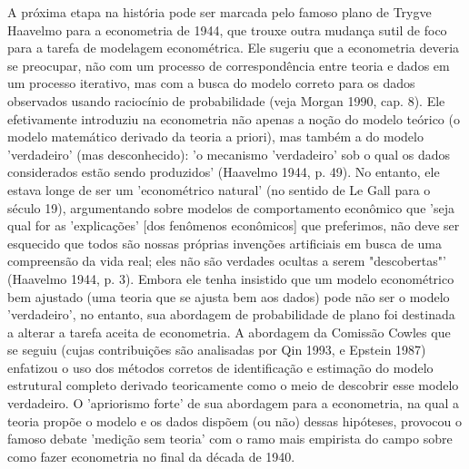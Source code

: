 \documentclass[a4paper,12pt]{article}[abntex2]
\begin{document}
A próxima etapa na história pode ser marcada pelo famoso plano de Trygve Haavelmo para a econometria de 1944, que trouxe outra mudança sutil de foco para a tarefa de modelagem econométrica. Ele sugeriu que a econometria deveria se preocupar, não com um processo de correspondência entre teoria e dados em um processo iterativo, mas com a busca do modelo correto para os dados observados usando raciocínio de probabilidade (veja Morgan 1990, cap. 8). Ele efetivamente introduziu na econometria não apenas a noção do modelo teórico (o modelo matemático derivado da teoria a priori), mas também a do modelo 'verdadeiro' (mas desconhecido): 'o mecanismo 'verdadeiro' sob o qual os dados considerados estão sendo produzidos' (Haavelmo 1944, p. 49). No entanto, ele estava longe de ser um 'econométrico natural' (no sentido de Le Gall para o século 19), argumentando sobre modelos de comportamento econômico que 'seja qual for as 'explicações' [dos fenômenos econômicos] que preferimos, não deve ser esquecido que todos são nossas próprias invenções artificiais em busca de uma compreensão da vida real; eles não são verdades ocultas a serem "descobertas"' (Haavelmo 1944, p. 3). Embora ele tenha insistido que um modelo econométrico bem ajustado (uma teoria que se ajusta bem aos dados) pode não ser o modelo 'verdadeiro', no entanto, sua abordagem de probabilidade de plano foi destinada a alterar a tarefa aceita de econometria. A abordagem da Comissão Cowles que se seguiu (cujas contribuições são analisadas por Qin 1993, e Epstein 1987) enfatizou o uso dos métodos corretos de identificação e estimação do modelo estrutural completo derivado teoricamente como o meio de descobrir esse modelo verdadeiro. O 'apriorismo forte' de sua abordagem para a econometria, na qual a teoria propõe o modelo e os dados dispõem (ou não) dessas hipóteses, provocou o famoso debate 'medição sem teoria' com o ramo mais empirista do campo sobre como fazer econometria no final da década de 1940.
\end{document}
